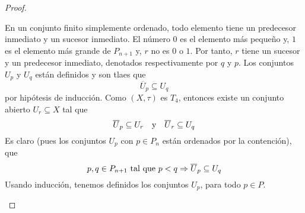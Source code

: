 \documentclass[12pt]{report}
\theoremstyle{largebreak}
\newcommand{\Cls}[1]{\ensuremath{\overline{#1}}}
\begin{document}
\begin{proof}
\begin{enumerate}
            En un conjunto finito simplemente ordenado, todo elemento tiene un predecesor inmediato y un sucesor inmediato. El número $0$ es el elemento más pequeño y, $1$ es el elemento más grande de $P_{n+1}$ y, $r$ no es $0$ o $1$. Por tanto, $r$ tiene un sucesor y un predecesor inmediato, denotados respectivamente por $q$ y $p$. Los conjuntos $U_p$ y $U_q$ están definidos y son tlaes que
            \begin{equation*}
                \Cls{U}_p\subseteq U_q
            \end{equation*}
            por hipótesis de inducción. Como $(X,\tau)$ es $T_4$, entonces existe un conjunto abierto $U_r\subseteq X$ tal que
            \begin{equation*}
                \Cls{U}_p\subseteq U_r\quad\textup{y}\quad\Cls{U}_r\subseteq U_q
            \end{equation*}
            Es claro (pues los conjuntos $U_p$ con $p\in P_n$ están ordenados por la contención), que
            \begin{equation*}
                p,q\in P_{ n+1}\textup{ tal que }p<q\Rightarrow \Cls{U}_p\subseteq U_q
            \end{equation*}
            Usando inducción, tenemos definidos los conjuntos $U_p$, para todo $p\in P$.


\end{enumerate}
\end{proof}
\end{document}
